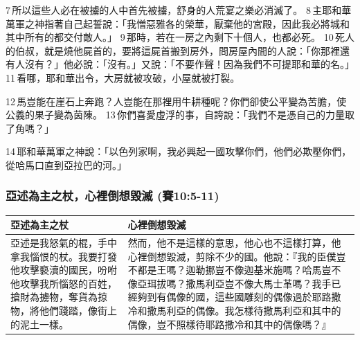 7 所以這些人必在被擄的人中首先被擄，舒身的人荒宴之樂必消滅了。 8 主耶和華萬軍之神指著自己起誓說：「我憎惡雅各的榮華，厭棄他的宮殿，因此我必將城和其中所有的都交付敵人。」 9 那時，若在一房之內剩下十個人，也都必死。 10 死人的伯叔，就是燒他屍首的，要將這屍首搬到房外，問房屋內間的人說：「你那裡還有人沒有？」他必說：「沒有。」又說：「不要作聲！因為我們不可提耶和華的名。」 11 看哪，耶和華出令，大房就被攻破，小屋就被打裂。

12 馬豈能在崖石上奔跑？人豈能在那裡用牛耕種呢？你們卻使公平變為苦膽，使公義的果子變為茵陳。 13 你們喜愛虛浮的事，自誇說：「我們不是憑自己的力量取了角嗎？」

14 耶和華萬軍之神說：「以色列家啊，我必興起一國攻擊你們，他們必欺壓你們，從哈馬口直到亞拉巴的河。」

\subsubsection{亞述為主之杖，心裡倒想毀滅 (賽10:5-11)}
\begin{table}[H]
\centering 
\begin{tabular}{p{5.5cm}|p{11.25cm}}\hline\hline
亞述為主之杖&心裡倒想毀滅\\\hline
亞述是我怒氣的棍，手中拿我惱恨的杖。我要打發他攻擊褻瀆的國民，吩咐他攻擊我所惱怒的百姓，搶財為擄物，奪貨為掠物，將他們踐踏，像街上的泥土一樣。
&然而，他不是這樣的意思，他心也不這樣打算，他心裡倒想毀滅，剪除不少的國。他說：『我的臣僕豈不都是王嗎？迦勒挪豈不像迦基米施嗎？哈馬豈不像亞珥拔嗎？撒馬利亞豈不像大馬士革嗎？我手已經夠到有偶像的國，這些國雕刻的偶像過於耶路撒冷和撒馬利亞的偶像。我怎樣待撒馬利亞和其中的偶像，豈不照樣待耶路撒冷和其中的偶像嗎？』\\\hline
\end{tabular}
\end{table}

